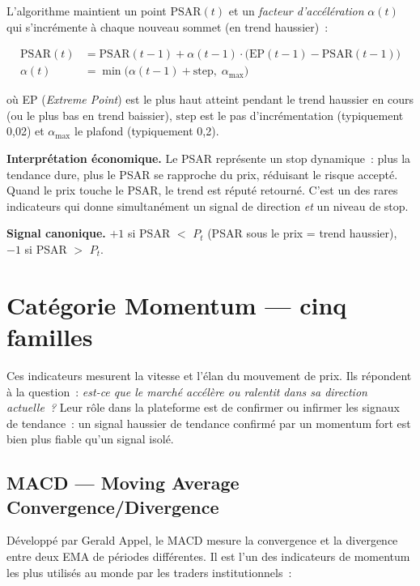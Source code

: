 L'algorithme maintient un point $\text{PSAR}(t)$ et un \textit{facteur d'accélération}
$\alpha(t)$ qui s'incrémente à chaque nouveau sommet (en trend haussier)~:

\begin{align}
    \text{PSAR}(t) &= \text{PSAR}(t-1) + \alpha(t-1) \cdot \bigl(\text{EP}(t-1) - \text{PSAR}(t-1)\bigr)
    \label{eq:psar} \\
    \alpha(t)      &= \min\!\bigl(\alpha(t-1) + \text{step},\; \alpha_{\max}\bigr)
    \label{eq:psar_af}
\end{align}

où EP (\textit{Extreme Point}) est le plus haut atteint pendant le trend haussier en
cours (ou le plus bas en trend baissier), $\text{step}$ est le pas d'incrémentation
(typiquement 0{,}02) et $\alpha_{\max}$ le plafond (typiquement 0{,}2).

\textbf{Interprétation économique.}
Le PSAR représente un stop dynamique~: plus la tendance dure, plus le PSAR se
rapproche du prix, réduisant le risque accepté. Quand le prix touche le PSAR,
le trend est réputé retourné. C'est un des rares indicateurs qui donne simultanément
un signal de direction \textit{et} un niveau de stop.

\textbf{Signal canonique.} $+1$ si PSAR $<$ $P_t$ (PSAR sous le prix = trend haussier),
$-1$ si PSAR $>$ $P_t$.

\section{Catégorie Momentum — cinq familles}
\label{sec:at_momentum}

Ces indicateurs mesurent la vitesse et l'élan du mouvement de prix. Ils répondent à
la question~: \textit{est-ce que le marché accélère ou ralentit dans sa direction
actuelle~?} Leur rôle dans la plateforme est de confirmer ou infirmer les signaux
de tendance~: un signal haussier de tendance confirmé par un momentum fort est bien
plus fiable qu'un signal isolé.

\subsection{MACD — Moving Average Convergence/Divergence}

Développé par Gerald Appel, le MACD mesure la convergence et la divergence entre deux
EMA de périodes différentes. Il est l'un des indicateurs de momentum les plus utilisés
au monde par les traders institutionnels~:

